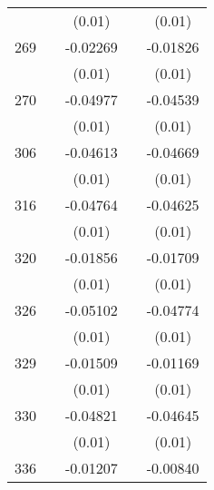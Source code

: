\begin{table}[htbp]
\begin{tabular}{l*{4}{c}}
                    &                     &      (0.01)         &                     &      (0.01)         \\
269                 &                     &    -0.02269\sym{*}  &                     &    -0.01826         \\
                    &                     &      (0.01)         &                     &      (0.01)         \\
270                 &                     &    -0.04977\sym{***}&                     &    -0.04539\sym{***}\\
                    &                     &      (0.01)         &                     &      (0.01)         \\
306                 &                     &    -0.04613\sym{**} &                     &    -0.04669\sym{**} \\
                    &                     &      (0.01)         &                     &      (0.01)         \\
316                 &                     &    -0.04764\sym{***}&                     &    -0.04625\sym{***}\\
                    &                     &      (0.01)         &                     &      (0.01)         \\
320                 &                     &    -0.01856         &                     &    -0.01709         \\
                    &                     &      (0.01)         &                     &      (0.01)         \\
326                 &                     &    -0.05102\sym{***}&                     &    -0.04774\sym{***}\\
                    &                     &      (0.01)         &                     &      (0.01)         \\
329                 &                     &    -0.01509         &                     &    -0.01169         \\
                    &                     &      (0.01)         &                     &      (0.01)         \\
330                 &                     &    -0.04821\sym{***}&                     &    -0.04645\sym{***}\\
                    &                     &      (0.01)         &                     &      (0.01)         \\
336                 &                     &    -0.01207         &                     &    -0.00840         \\

\end{tabular}
\end{table}
